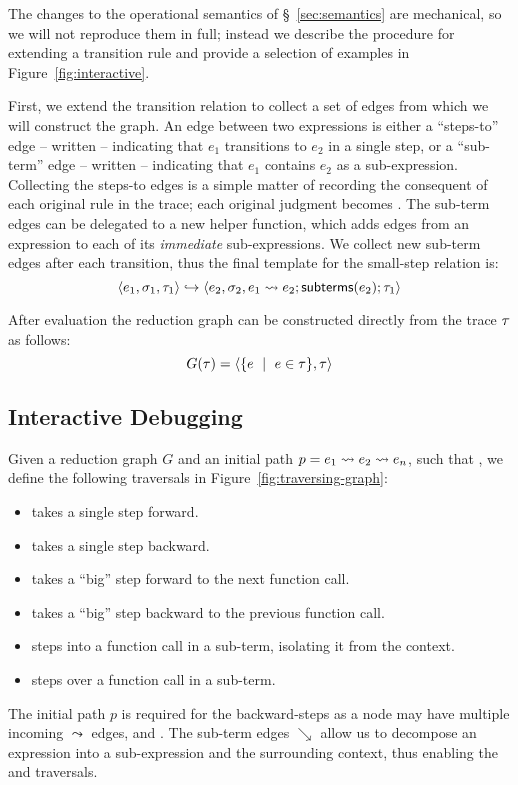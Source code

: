 %
The changes to the operational semantics of \S~\ref{sec:semantics} are
mechanical, so we will not reproduce them in full; instead we describe
the procedure for extending a transition rule and provide a selection of
examples in Figure~\ref{fig:interactive}.

First, we extend the transition relation to collect a set of edges from
which we will construct the graph.
%
An edge between two expressions is either a ``steps-to'' edge -- written
 -- indicating that $e_1$ transitions to $e_2$ in a
single step, or a ``sub-term'' edge -- written  --
indicating that $e_1$ contains $e_2$ as a sub-expression.
%
Collecting the steps-to edges is a simple matter of recording the
consequent of each original rule in the trace; each original judgment
 becomes
.
%
The sub-term edges can be delegated to a new \subtermssym helper
function, which adds edges from an expression to each of its
\emph{immediate} sub-expressions.
%
We collect new sub-term edges after each transition, thus the final
template for the small-step relation is:
\[
\langle e_1, \sigma_1, \tau_1 \rangle \hookrightarrow \langle e_2, \sigma_2, e_1 \leadsto e_2; \mathsf{subterms}(e_2); \tau_1 \rangle
\]

After evaluation the reduction graph can be constructed directly from
the trace $\tau$ as follows:
\[
G(\tau) = \langle \{e \ \mid \  e \in \tau\}, \tau \rangle
\]

\subsection{Interactive Debugging}
\label{sec:traversing-graph}

Given a reduction graph $G$ and an initial path
$p = e_1 \leadsto e_2 \leadsto e_n$, such that
, we define the following
traversals in Figure~\ref{fig:traversing-graph}:
%
\begin{itemize}
\item \stepforwardsym takes a single step forward.
\item \stepbackwardsym takes a single step backward.
\item \jumpforwardsym takes a ``big'' step forward to the next function call.
\item \jumpbackwardsym takes a ``big'' step backward to the previous function call.
\item \stepintosym steps into a function call in a sub-term, isolating it from the context.
\item \stepoversym steps over a function call in a sub-term.
\end{itemize}
%
The initial path $p$ is required for the backward-steps as a node may
have multiple incoming $\leadsto$ edges, \eg
{} and .
%
The sub-term edges $\searrow$ allow us to decompose an expression into a
sub-expression and the surrounding context, thus enabling the \stepintosym
and \stepoversym traversals.
%


